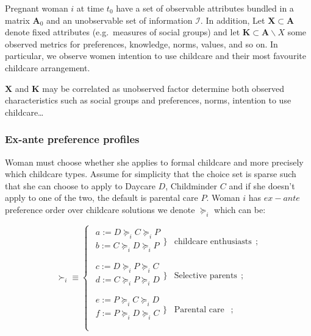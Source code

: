 \documentclass[
]{article}
\begin{document}
Pregnant woman \(i\) at time \(t_0\) have a set of observable attributes bundled in a matrix \(\mathbf{A}_0\) and an unobservable set of information \(\mathcal{I}\). In addition, Let \(\mathbf{X} \subset \mathbf{A}\) denote fixed attributes
(e.g.~measures of social groups) and let \(\mathbf{K}\subset \mathbf{A}\backslash X\) some observed metrics for preferences, knowledge, norms, values, and so on.
In particular, we observe women intention to use childcare and their most favourite childcare arrangement.

\(\mathbf{X}\) and \(\mathbf{K}\) may be correlated as unobserved factor determine both observed characteristics such as social groups and preferences, norms, intention to use childcare\ldots{}

\subsubsection{Ex-ante preference profiles}\label{ex-ante-preference-profiles}

Woman must choose whether she applies to formal childcare and more precisely which childcare types.
Assume for simplicity that the choice set is sparse such that she can choose to apply to Daycare \(D\), Childminder \(C\) and if she doesn't apply to one of the two, the default is parental care \(P\).
Woman \(i\) has \(ex-ante\) preference order over childcare solutions we denote \(\succeq_i\) which can be:

\begin{equation}
    \succ_i \equiv 
      \left\{ 
          \begin{aligned}
            \left. 
              \begin{matrix}
                a:=D\succeq_iC\succeq_iP    \\
                b:=C\succeq_iD\succeq_iP    \\
              \end{matrix} 
            \} \right. & 
                \text{childcare enthusiasts} ~~;    \\
            \left. 
              \begin{matrix}
                c:=D\succeq_iP\succeq_iC\\
                d:=C\succeq_iP\succeq_iD\\
              \end{matrix}
            \} \right. & 
                  \text{Selective parents} ~~;    \\
            \left. 
              \begin{matrix}
                e:=P\succeq_iC\succeq_iD\\
                f:=P\succeq_iD\succeq_iC\\
              \end{matrix} 
            \}\right. & 
                  \text{Parental care } ~~;  \\
          \end{aligned} 
    \right.
\end{equation}
\end{document}
